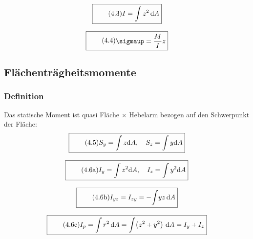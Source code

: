 \documentclass[11pt]{article}
\newcommand{\1}{ {\mathds{1}} }
\newcommand{\td}{\,\text{d}}
\renewcommand{\sigma  }{\sigmaup   }
\begin{document}
				\begin{equation}
			\boxed{
				\tag{4.3}
				\begin{split}
					I = \int z^2 \td A
				\end{split}
			}
		\end{equation}

						\begin{equation}
			\boxed{
				\tag{4.4}
				\begin{split}
					\sigma = \frac{M}{I} z
				\end{split}
			}
		\end{equation}

		\subsection{Flächenträgheitsmomente}
		\subsubsection{Definition}

		Das statische Moment ist quasi Fläche $\times$ Hebelarm bezogen auf den Schwerpunkt der Fläche:
		\begin{equation}
			\boxed{
				\tag{4.5}
				\begin{split}
					S_y
					=
					\int z \text{d} A, \quad
					S_z
					=
					\int y \text{d} A
				\end{split}
			}
		\end{equation}

		\begin{equation}
			\boxed{
				\tag{4.6a}
				\begin{split}
					I_y
					=
					\int
					z^2\text{d}A, \quad
					I_z
					=
					\int
					y^2\text{d}A
				\end{split}
			}
		\end{equation}
		
		\begin{equation}
			\boxed{
				\tag{4.6b}
				\begin{split}
					I_{yz} = I_{zy} = -\!\int\! y z\, \text{d}A
				\end{split}
			}
		\end{equation}
		
		\begin{equation}
			\boxed{
				\tag{4.6c}
				\begin{split}
					I_p = \int r^2 \,\text{d}A = \int\! \left( z^2 + y^2  \right)\,\text{d}A = I_y + I_z
				\end{split}
			}
		\end{equation}
\end{document}

